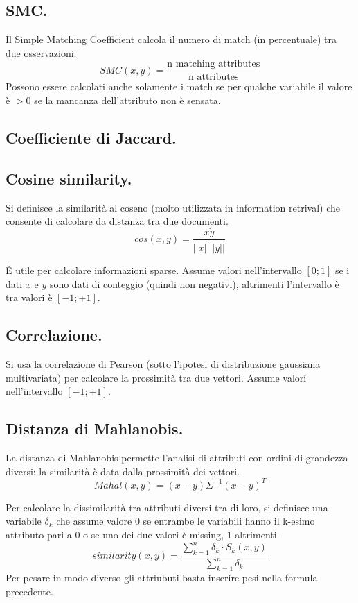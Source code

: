 \documentclass[11pt, a4page, twocolumn]{article}
\begin{document}
\subsection{SMC.}
Il Simple Matching Coefficient calcola il numero di match (in percentuale) tra due osservazioni:
\begin{equation*}
SMC(x, y) = \frac{\text{n matching attributes}}{\text{n attributes}}
\end{equation*}
Possono essere calcolati anche solamente i match se per qualche variabile il valore è $> 0$ se la mancanza dell'attributo non è sensata.

\subsection{Coefficiente di Jaccard.}

\subsection{Cosine similarity.}
Si definisce la similarità al coseno (molto utilizzata in information retrival) che consente di calcolare da distanza tra due documenti.
\begin{equation*}
cos(x, y) = \frac{x \dot y}{||x|| \dot ||y||}
\end{equation*}

È utile per calcolare informazioni sparse.
Assume valori nell'intervallo $[0;1]$ se i dati $x$ e $y$ sono dati di conteggio (quindi non negativi), altrimenti l'intervallo è tra valori è $[-1;+1]$.

\subsection{Correlazione.}
Si usa la correlazione di Pearson (sotto l'ipotesi di distribuzione gaussiana multivariata) per calcolare la prossimità tra due vettori.
Assume valori nell'intervallo $[-1;+1]$.

\subsection{Distanza di Mahlanobis.}
La distanza di Mahlanobis permette l'analisi di attributi con ordini di grandezza diversi: la similarità è data dalla prossimità dei vettori.
\begin{equation*}
Mahal(x, y) = (x - y)\Sigma^{-1}(x - y)^T
\end{equation*}

Per calcolare la dissimilarità tra attributi diversi tra di loro, si definisce una variabile $\delta_k$ che assume valore $0$ se entrambe le variabili hanno il k-esimo attributo pari a $0$ o se uno dei due valori è missing, $1$ altrimenti.
\begin{equation*}
similarity(x, y) = \frac{\sum^{n}_{k=1}{\delta_k \cdot S_k(x, y)}}{\sum^{n}_{k=1}{\delta_k}}
\end{equation*}
Per pesare in modo diverso gli attriubuti basta inserire pesi nella formula precedente.
\end{document}
